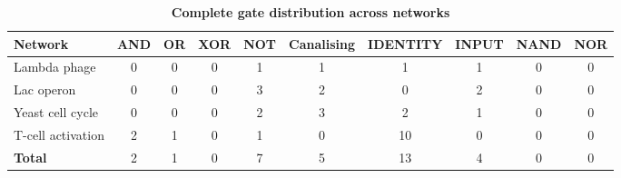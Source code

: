 \documentclass[12pt]{article}
\begin{document}
\begin{table}[htbp]
\centering
\caption{\textbf{Complete gate distribution across networks}}
\label{tab:gate_dist_full}
\begin{tabular}{@{}lccccccccc@{}}
\toprule
\textbf{Network} & \textbf{AND} & \textbf{OR} & \textbf{XOR} & \textbf{NOT} & \textbf{Canalising} & \textbf{IDENTITY} & \textbf{INPUT} & \textbf{NAND} & \textbf{NOR} \\
\midrule
Lambda phage & 0 & 0 & 0 & 1 & 1 & 1 & 1 & 0 & 0 \\
Lac operon & 0 & 0 & 0 & 3 & 2 & 0 & 2 & 0 & 0 \\
Yeast cell cycle & 0 & 0 & 0 & 2 & 3 & 2 & 1 & 0 & 0 \\
T-cell activation & 2 & 1 & 0 & 1 & 0 & 10 & 0 & 0 & 0 \\
\hline
\textbf{Total} & 2 & 1 & 0 & 7 & 5 & 13 & 4 & 0 & 0 \\
\bottomrule
\end{tabular}
\end{table}
\end{document}
